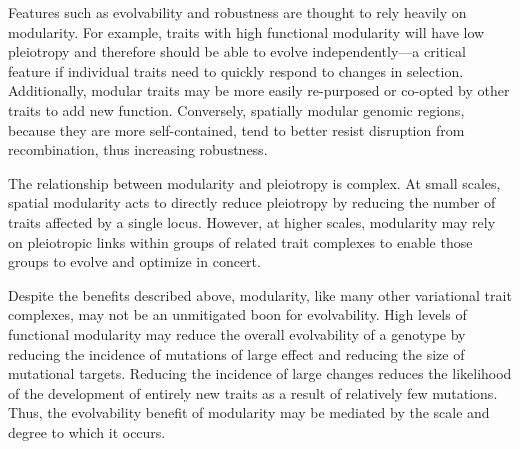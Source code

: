\documentclass[PhD]{msu-thesis}
\begin{document}
Features such as evolvability and robustness are thought to rely heavily on modularity\cite{gunter_p._wagner_perspective:_1996}. For example, traits with high functional modularity will have low pleiotropy and therefore should be able to evolve independently---a critical feature if individual traits need to quickly respond to changes in selection. Additionally, modular traits may be more easily re-purposed or co-opted by other traits to add new function\cite{ravasz_hierarchical_2002}.
Conversely, spatially modular genomic regions, because they are more self-contained, tend to better resist disruption from recombination, thus increasing robustness\cite{misevic_sexual_2006}. 

The relationship between modularity and pleiotropy is complex. At small scales, spatial modularity acts to directly reduce pleiotropy by reducing the number of traits affected by a single locus\cite{misevic_sexual_2006}. However, at higher scales, modularity may rely on pleiotropic links within groups of related trait complexes to enable those groups to evolve and optimize in concert\cite{gunter_p._wagner_pleiotropic_2011}. 

Despite the benefits described above, modularity, like many other variational trait complexes, may not be an unmitigated boon for evolvability. High levels of functional modularity may reduce the overall evolvability of a genotype by reducing the incidence of mutations of large effect and reducing the size of mutational targets\cite{hansen_is_2003}. Reducing the incidence of large changes reduces the likelihood of the development of entirely new traits as a result of relatively few mutations. Thus, the evolvability benefit of modularity may be mediated by the scale and degree to which it occurs.
\end{document}
